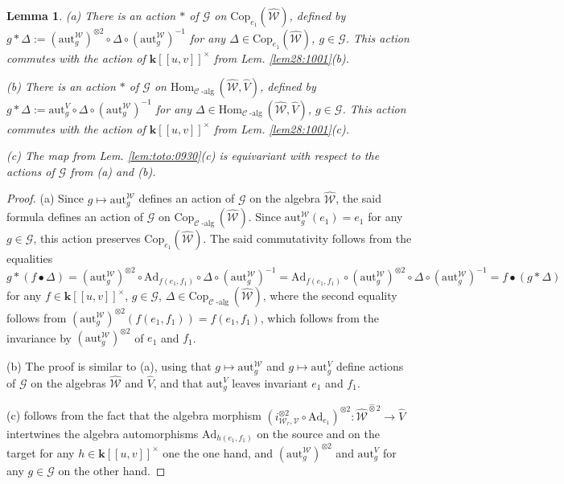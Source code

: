 \documentclass[10pt]{amsart}
\newtheorem{lem}[thm]{Lemma}
\numberwithin{equation}{subsection}
\begin{document}
\begin{lem}\label{lem:43:0401:TER}
(a) There is an action $*$ of $\mathcal G$ on $\mathrm{Cop}_{e_1}(\hat{\mathcal W})$, 
defined by $g*\Delta:=(\mathrm{aut}_{g}^{\mathcal W})^{\otimes2}\circ
\Delta\circ (\mathrm{aut}_{g}^{\mathcal W})^{-1}$ 
for any 
$\Delta\in\mathrm{Cop}_{e_1}(\hat{\mathcal W})$, 
$g\in\mathcal G$. This action commutes with the action of $\mathbf k[[u,v]]^\times$ 
from Lem. \ref{lem28:1001}(b). 

(b) There is an action $*$ of $\mathcal G$ on 
$\mathrm{Hom}_{\mathcal C\operatorname{-alg}}(\hat{\mathcal W},\hat V)$, 
defined by $g*\Delta:=
\mathrm{aut}_{g}^V\circ\Delta\circ (\mathrm{aut}_{g}^{\mathcal W})^{-1}$ 
for any 
$\Delta\in\mathrm{Hom}_{\mathcal C\operatorname{-alg}}(\hat{\mathcal W},\hat V)$, 
$g\in\mathcal G$. 
This action commutes with the action of $\mathbf k[[u,v]]^\times$ from Lem. \ref{lem28:1001}(c). 

(c) The map from Lem. \ref{lem:toto:0930}(c) is 
equivariant with respect to the actions of $\mathcal G$ from (a) and (b). 
\end{lem}


\begin{proof}
(a) Since $g\mapsto \mathrm{aut}_g^{\mathcal W}$ defines an action of $\mathcal G$ on the 
algebra $\hat{\mathcal W}$, 
the said formula defines an action of $\mathcal G$ on 
$\mathrm{Cop}_{\mathcal C\operatorname{-alg}}(\hat{\mathcal W})$. 
Since $\mathrm{aut}_{g}^{\mathcal W}(e_1)=e_1$ for any $g\in\mathcal G$, 
this action preserves $\mathrm{Cop}_{e_1}(\hat{\mathcal W})$. 
The said commutativity follows from the equalities
$$
g*(f\bullet\Delta)=(\mathrm{aut}_{g}^{\mathcal W})^{\otimes2}\circ
\mathrm{Ad}_{f(e_1,f_1)}\circ \Delta\circ (\mathrm{aut}_{g}^{\mathcal W})^{-1}
=\mathrm{Ad}_{f(e_1,f_1)}\circ(\mathrm{aut}_{g}^{\mathcal W})^{\otimes2}\circ
 \Delta\circ (\mathrm{aut}_{g}^{\mathcal W})^{-1}
=f\bullet(g*\Delta) 
$$
for any $f\in \mathbf k[[u,v]]^\times$, $g\in \mathcal G$, $\Delta\in 
\mathrm{Cop}_{\mathcal C\operatorname{-alg}}(\hat{\mathcal W})$, where the second equality follows from 
$(\mathrm{aut}_{g}^{\mathcal W})^{\otimes2}(f(e_1,f_1))=f(e_1,f_1)$, 
which follows from the invariance by 
$(\mathrm{aut}_{g}^{\mathcal W})^{\otimes2}$ of $e_1$ and $f_1$. 

    (b) The proof is similar to (a), using that $g\mapsto \mathrm{aut}_g^{\mathcal W}$ and 
    $g\mapsto \mathrm{aut}_g^{V}$ define actions of  
    $\mathcal G$ on the algebras $\hat{\mathcal W}$ and $\hat V$, and that $\mathrm{aut}_g^{V}$ leaves 
    invariant $e_1$ and $f_1$. 


(c) follows from the fact that the algebra morphism 
$(i_{\mathcal W_r,\mathcal V}^{\otimes2}\circ \mathrm{Ad}_{e_1})^{\otimes2} : 
\hat{\mathcal W}^{\hat\otimes2}\to\hat V$ intertwines the algebra automorphisms
$\mathrm{Ad}_{h(e_1,f_1)}$ on the source and on the target for any $h\in\mathbf k[[u,v]]^\times$ 
one the one hand, and  $(\mathrm{aut}_{g}^{\mathcal W})^{\otimes2}$
and $\mathrm{aut}_g^V$ for any $g\in\mathcal G$ on the other hand. 
\end{proof}
\end{document}
